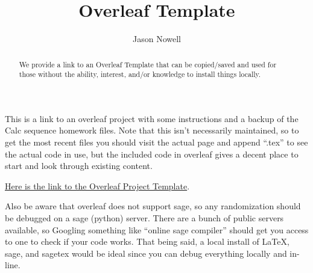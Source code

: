 \documentclass{ximera}
\title{Overleaf Template}
\author{Jason Nowell}
\begin{document}
\begin{abstract}
    We provide a link to an Overleaf Template that can be copied/saved and used for those without the ability, interest, and/or knowledge to install things locally.
\end{abstract}
\maketitle

This is a link to an overleaf project with some instructions and a backup of the Calc sequence homework files. Note that this isn't necessarily maintained, so to get the most recent files you should visit the actual page and append ``.tex'' to see the actual code in use, but the included code in overleaf gives a decent place to start and look through existing content.

\href{https://www.overleaf.com/read/ptfwfbvzfxjz}{Here is the link to the Overleaf Project Template}. 

Also be aware that overleaf does not support sage, so any randomization should be debugged on a sage (python) server. There are a bunch of public servers available, so Googling something like ``online sage compiler'' should get you access to one to check if your code works. That being said, a local install of LaTeX, sage, and sagetex would be ideal since you can debug everything locally and in-line.
\end{document}
